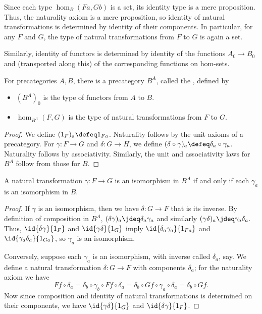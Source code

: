 Since each type $\hom_B(Fa,Gb)$ is a set, its identity type is a mere proposition.
Thus, the naturality axiom is a mere proposition, so identity of natural transformations is determined by identity of their components.
In particular, for any $F$ and $G$, the type of natural transformations from $F$ to $G$ is again a set.

Similarly, identity of functors is determined by identity of the functions $A_0\to B_0$ and (transported along this) of the corresponding functions on hom-sets.

\begin{defn}\label{ct:functor-precat}
  For precategories $A,B$, there is a precategory $B^A$, called the , defined by
  \begin{itemize}
  \item $(B^A)_0$ is the type of functors from $A$ to $B$.
  \item $\hom_{B^A}(F,G)$ is the type of natural transformations from $F$ to $G$.
  \end{itemize}
\end{defn}
\begin{proof}
  We define $(1_F)_a\defeq 1_{Fa}$.
  Naturality follows by the unit axioms of a precategory.
  For $\gamma:F\to G$ and $\delta:G\to H$, we define $(\delta\circ\gamma)_a\defeq \delta_a\circ \gamma_a$.
  Naturality follows by associativity.
  Similarly, the unit and associativity laws for $B^A$ follow from those for $B$.
\end{proof}

\begin{lem}\label{ct:natiso}
  A natural transformation $\gamma:F\to G$ is an isomorphism in $B^A$ if and only if each $\gamma_a$ is an isomorphism in $B$.
\end{lem}
\begin{proof}
  If $\gamma$ is an isomorphism, then we have $\delta:G\to F$ that is its inverse.
  By definition of composition in $B^A$, $(\delta\gamma)_a\jdeq \delta_a\gamma_a$ and similarly $(\gamma\delta)_a\jdeq \gamma_a\delta_a$.
  Thus, $\id{\delta\gamma}{1_F}$ and $\id{\gamma\delta}{1_G}$ imply $\id{\delta_a\gamma_a}{1_{Fa}}$ and $\id{\gamma_a\delta_a}{1_{Ga}}$, so $\gamma_a$ is an isomorphism.

  Conversely, suppose each $\gamma_a$ is an isomorphism, with inverse called $\delta_a$, say.
We define a natural transformation $\delta:G\to F$ with components $\delta_a$; for the naturality axiom we have
  \[ Ff\circ \delta_a = \delta_b\circ \gamma_b\circ Ff \circ \delta_a = \delta_b\circ Gf\circ \gamma_a\circ \delta_a = \delta_b\circ Gf. \]
  Now since composition and identity of natural transformations is determined on their components, we have $\id{\gamma\delta}{1_G}$ and $\id{\delta\gamma}{1_F}$.
\end{proof}

